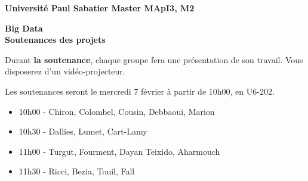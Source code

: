 \documentclass[11pt,reqno]{amsart}
\newcommand {\COURS} {Big Data}
\newcommand {\FORMATION} {Universit\'e Paul Sabatier \hfill Master MApI3, M2}
\begin{document}
\addtolength{\baselineskip}{+0.1\baselineskip}
\pagestyle{empty}
{\sc \bf \noindent \FORMATION \\

}
\vspace{0.5cm}
\begin{center}
    {\bf \COURS \\
        \vspace{0.5cm}
        Soutenances des projets\\
    }
\end{center}
\vspace{1cm}

Durant {\bf la soutenance}, chaque groupe fera une présentation de son travail. Vous disposerez d'un vidéo-projecteur.

\vspace*{0.5cm}


Les soutenances seront le mercredi 7 février à partir de 10h00, en U6-202.

\begin{itemize}

    \item{10h00 -} Chiron, Colombel, Cousin, Debbaoui, Marion
    \item{10h30 -} Dallies, Lumet, Cart-Lamy
    \item{11h00 -} Turgut, Fourment, Dayan Teixido, Aharmouch
    \item{11h30 -} Ricci, Bezia, Touil, Fall

\end{itemize}
\end{document}
